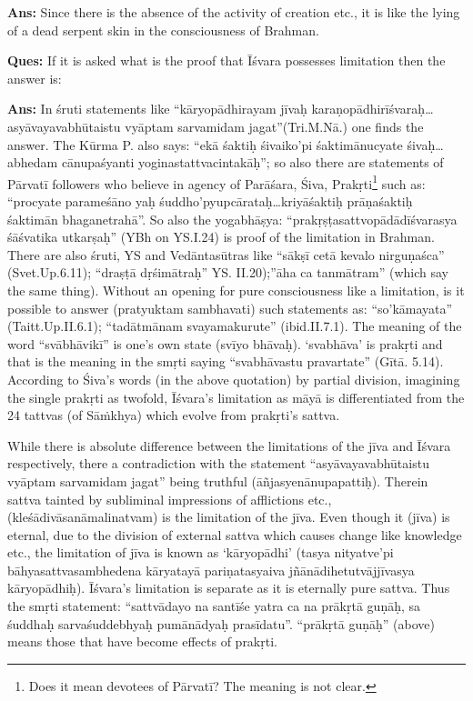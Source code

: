 \textbf{Ans:} Since there is the absence of the activity of creation etc., it is like the lying of a dead serpent skin in the consciousness of Brahman.

\textbf{Ques:} If it is asked what is the proof that Īśvara possesses limitation then the answer is: 

\textbf{Ans:} In śruti statements like “kāryopādhirayam jīvaḥ karaṇopādhirīśvaraḥ…asyāvayavabhūtaistu vyāptam sarvamidam jagat”(Tri.M.Nā.\-) one finds the answer. The Kūrma P. also says: “ekā śaktiḥ śivaiko’pi śaktimānucyate śivaḥ…abhedam cānupaśyanti yoginastattvacintakāḥ”; so also there are statements of Pārvatī followers who believe in agency of Parāśara, Śiva, Prakṛti\footnote{Does it mean devotees of Pārvatī? The meaning is not clear.} such as: “procyate parameśāno yaḥ śuddho’pyupcārataḥ…kriyāśaktiḥ prāṇaśaktiḥ śaktimān bhaganetrahā”.  So also the yogabhāṣya: “prakṛṣṭasattvopādādīśvarasya śāśvatika utkarṣaḥ” (YBh on YS.I.24) is proof of the limitation in Brahman. There are also śruti, YS and Vedāntasūtras like “sākṣī cetā kevalo nirguṇaśca” (Svet.Up.6.11); “draṣṭā dṛśimātraḥ” YS. II.20);”āha ca tanmātram” (which say the same thing). Without an opening for pure consciousness like a limitation, is it possible to answer (pratyuktam sambhavati) such statements as: “so’kāmayata” (Taitt.Up.II.6.1); “tadātmānam svayamakurute” (ibid.II.7.1). The meaning of the word “svābhāvikī” is one’s own state (svīyo bhāvaḥ). ‘svabhāva’ is prakṛti and that is the meaning in the smṛti saying “svabhāvastu pravartate” (Gītā. 5.14).  According to Śiva’s words (in the above quotation) by partial division, imagining the single prakṛti as twofold, Īśvara’s limitation as māyā is differentiated from the 24 tattvas (of Sāṁkhya) which evolve from prakṛti’s sattva.

While there is absolute difference between the limitations of the jīva and Īśvara respectively, there a contradiction with the statement “asyāvayavabhūtaistu vyāptam sarvamidam jagat” being truthful (āñjasyenā\-nupapattiḥ). Therein sattva tainted by subliminal impressions of afflictions etc.,(kleśādivāsanāmalinatvam) is the limitation of the jīva. Even though it (jīva) is eternal, due to the division of external sattva which causes change like knowledge etc., the limitation of jīva is known as ‘kāryopādhi’ (tasya nityatve’pi bāhyasattvasambhedena kāryatayā pariṇatasyaiva jñānādihetutvājjīvasya kāryopādhiḥ). Īśvara’s limitation is separate as it is eternally pure sattva. Thus the smṛti statement: “sattvādayo na santīśe yatra ca na prākṛtā guṇāḥ, sa śuddhaḥ sarvaśuddebhyaḥ pumānādyaḥ prasīdatu”. “prākṛtā guṇāḥ” (above) means those that have become effects of prakṛti. 

